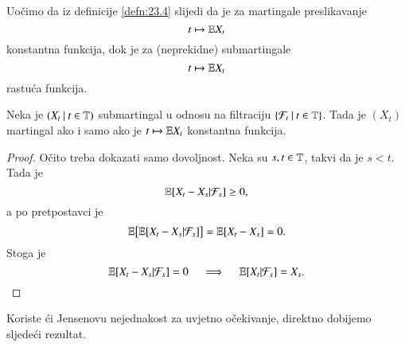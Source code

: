Uo\v cimo da iz definicije \ref{defn:23.4} slijedi da je za martingale preslikavanje
\begin{equation*}
    t \mapsto \mathbb{E} X_t
\end{equation*}
konstantna funkcija, dok je za (neprekidne) submartingale
\begin{equation*}
    t \mapsto \mathbb{E} X_t
\end{equation*}
rastu\' ca funkcija.

\begin{prop}    \label{prop:23.10}
    Neka je $({X_t} \: | \: {t \in \mathbb{T}})$ submartingal u odnosu na filtraciju $\{{\mathcal{F}_t} \: | \: {t \in \mathbb{T}}\}$.
    Tada je $(X_t)$ martingal ako i samo ako je $t \mapsto \mathbb{E} X_t$ konstantna funkcija.
\end{prop}

\begin{proof}
    O\v cito treba dokazati samo dovoljnost.
    Neka su $s, t \in \mathbb{T}$, takvi da je $s < t$.
    Tada je
    \begin{equation*}
        \mathbb{E} [X_t - X_s | \mathcal{F}_s] \geq 0,
    \end{equation*}
    a po pretpostavci je
    \begin{equation*}
        \mathbb{E} \big[ \mathbb{E} [X_t - X_s | \mathcal{F}_s] \big] = \mathbb{E} [X_t - X_s] = 0.
    \end{equation*}
    Stoga je
    \begin{equation*}
        \mathbb{E} [X_t - X_s | \mathcal{F}_s] = 0 \quad \implies \quad \mathbb{E} [X_t | \mathcal{F}_s] = X_s.
    \end{equation*}
\end{proof}

Koriste \' ci Jensenovu nejednakost za uvjetno o\v cekivanje, direktno dobijemo sljede\' ci rezultat.
